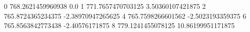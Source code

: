 0 768.2621459960938 0.0
1 771.7657470703125 3.50360107421875
2 765.8724365234375 -2.38970947265625
4 765.7598266601562 -2.5023193359375
6 765.8563842773438 -2.40576171875
8 779.1241455078125 10.86199951171875
